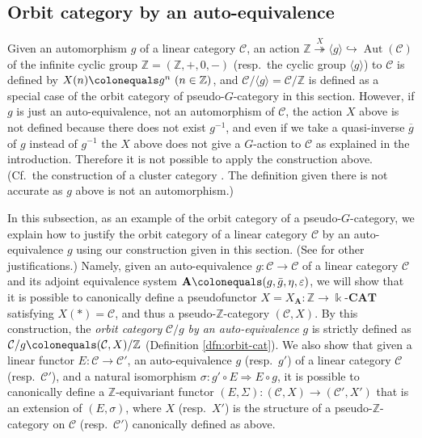 \documentclass{surv-l}
\numberwithin{equation}{chapter}
\numberwithin{figure}{chapter}
\theoremstyle{plain}
\theoremstyle{definition}
\theoremstyle{remark}
\newcommand{\kCAT}{\Bbbk\text{-}\mathbf{CAT}}
\DeclareMathOperator{\Aut}{Aut}
\begin{document}
\subsection{Orbit category by an auto-equivalence}

Given an automorphism $g$ of a linear category ${\mathcal{C}}$,
an action
$\mathbb{Z} \overset{X}{\twoheadrightarrow} {\langle g \rangle} \hookrightarrow \Aut({\mathcal{C}})$
of the infinite cyclic group $\mathbb{Z} = (\mathbb{Z}, +, 0, -)$
(resp.\ the cyclic group ${\langle g \rangle}$) to ${\mathcal{C}}$ is defined
by $X(n)\colonequals  g^n\ (n \in \mathbb{Z})$, and
${\mathcal{C}}/{\langle g \rangle} = {\mathcal{C}}/\mathbb{Z}$ is defined as a special case of
the orbit category of pseudo-$G$-category in this section.
However, if $g$ is just an auto-equivalence, not an automorphism of ${\mathcal{C}}$,
the action $X$ above is not defined because there does not exist
$g^{-1}$, and even if we take a quasi-inverse $\overline{g}$ of $g$ instead of $g^{-1}$
the $X$ above does not give a $G$-action to ${\mathcal{C}}$ as explained in the introduction.
Therefore it is not possible to apply the construction above.
(Cf.\ the construction of a cluster category \cite[\S 1]{BMRRT}.
The definition given there is not accurate as $g$ above is not an automorphism.)

In this subsection,
as an example of the orbit category of a pseudo-$G$-category,
we explain how to justify the orbit category of a linear category ${\mathcal{C}}$
by an auto-equivalence $g$ using our construction given in this section.
(See \cite{Asa11} for other justifications.)
Namely, given an auto-equivalence $g \colon {\mathcal{C}} \to {\mathcal{C}}$ of a linear category
${\mathcal{C}}$ and its adjoint equivalence system $\mathbf{A}\colonequals (g, \bar{g}, \eta, \varepsilon)$,
we will show that it is possible to canonically define
a pseudofunctor $X = X_\mathbf{A} \colon \mathbb{Z} \to \kCAT$ satisfying
$X(*)={\mathcal{C}}$, and thus a pseudo-$\mathbb{Z}$-category $({\mathcal{C}}, X)$.
By this construction, the \emph{orbit category} ${\mathcal{C}}/g$ \emph{by an auto-equivalence} $g$ is strictly defined as ${\mathcal{C}}/g\colonequals  ({\mathcal{C}}, X)/\mathbb{Z}$ (Definition \ref{dfn:orbit-cat}).
We also show that
given a linear functor $E \colon {\mathcal{C}} \to {\mathcal{C}}'$, an auto-equivalence
$g$ (resp.\ $g'$) of a linear category ${\mathcal{C}}$ (resp.\ ${\mathcal{C}}'$), and
a natural isomorphism $\sigma \colon g'\circ E \Rightarrow E \circ g$,
it is possible to canonically define a $\mathbb{Z}$-equivariant functor
$(E, \Sigma) \colon ({\mathcal{C}}, X) \to ({\mathcal{C}}', X')$ that is an extension of $(E, \sigma)$,
where $X$ (resp.\ $X'$) is the structure of a pseudo-$\mathbb{Z}$-category on ${\mathcal{C}}$
(resp.\ ${\mathcal{C}}'$) canonically defined as above.
\end{document}
